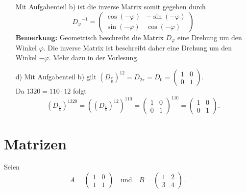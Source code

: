 \begin{itemize}
Mit Aufgabenteil b) ist die inverse Matrix somit gegeben durch
$$
{D_\varphi}^{-1}=\begin{pmatrix}
		\cos(-\varphi)	&-\sin(-\varphi)	\\
		\sin(-\varphi)	&\cos(-\varphi)
	\end{pmatrix}
$$
\textbf{Bemerkung:} Geometrisch beschreibt die Matrix $D_\varphi$ eine Drehung um den Winkel $\varphi$. Die inverse Matrix ist beschreibt daher eine Drehung um den Winkel $-\varphi$. Mehr dazu in der Vorlesung.
\item[d)]
Mit Aufgabenteil b) gilt $({D_\frac{\pi}{6}})^{12}={D_{2\pi}}=D_0 =\begin{pmatrix} 1 & 0 \\ 0 & 1\end{pmatrix}$.\\
Da $1320=110 \cdot 12$ folgt 
$$
({D_\frac{\pi}{6}})^{1320}=\left(({D_\frac{\pi}{6}})^{12}\right)^{110}=\begin{pmatrix} 1 & 0 \\ 0 & 1\end{pmatrix}^{110}=\begin{pmatrix} 1 & 0 \\ 0 & 1\end{pmatrix}.
$$
\end{itemize}

 \newpage
\section{Matrizen}

Seien
$$
	A
	=
	\begin{pmatrix}
		1	&0	\\
		1	&1	
	\end{pmatrix}
	\quad
	\text{und}
	\quad
	B
	=
	\begin{pmatrix}
		1	&2	\\
		3	&4	
	\end{pmatrix}.
$$

